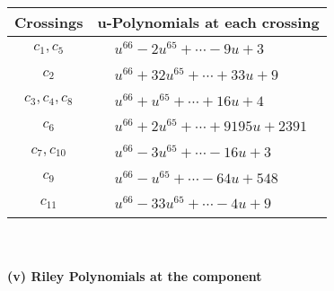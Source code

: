 \documentclass[1p]{elsarticle_modified}
\theoremstyle{definition}
\begin{document}
\begin{tabular}{m{50pt}|m{274pt}}
Crossings & \hspace{64pt}u-Polynomials at each crossing \\
\hline $$\begin{aligned}c_{1},c_{5}\end{aligned}$$&$\begin{aligned}
&u^{66}-2 u^{65}+\cdots-9 u+3
\end{aligned}$\\
\hline $$\begin{aligned}c_{2}\end{aligned}$$&$\begin{aligned}
&u^{66}+32 u^{65}+\cdots+33 u+9
\end{aligned}$\\
\hline $$\begin{aligned}c_{3},c_{4},c_{8}\end{aligned}$$&$\begin{aligned}
&u^{66}+u^{65}+\cdots+16 u+4
\end{aligned}$\\
\hline $$\begin{aligned}c_{6}\end{aligned}$$&$\begin{aligned}
&u^{66}+2 u^{65}+\cdots+9195 u+2391
\end{aligned}$\\
\hline $$\begin{aligned}c_{7},c_{10}\end{aligned}$$&$\begin{aligned}
&u^{66}-3 u^{65}+\cdots-16 u+3
\end{aligned}$\\
\hline $$\begin{aligned}c_{9}\end{aligned}$$&$\begin{aligned}
&u^{66}- u^{65}+\cdots-64 u+548
\end{aligned}$\\
\hline $$\begin{aligned}c_{11}\end{aligned}$$&$\begin{aligned}
&u^{66}-33 u^{65}+\cdots-4 u+9
\end{aligned}$\\
\hline
\end{tabular}\\~\\
\newpage\renewcommand{\arraystretch}{1}
\flushleft \textbf{(v) Riley Polynomials at the component}\newline \\
\end{document}
